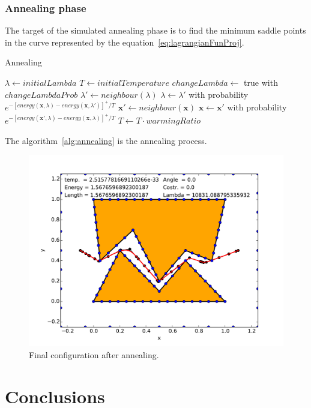 \documentclass[a4paper]{article}
\begin{document}
\subsubsection{Annealing phase}
The target of the simulated annealing phase is to find the minimum
saddle points in
the curve represented by the
equation~\eqref{eq:lagrangianFunProj}.
\begin{algorithm}
 \caption{Annealing}\label{alg:annealing}
 \begin{algorithmic}[1]
   \State $\lambda\gets initialLambda$
   \State $T\gets initialTemperature$
   \State $changeLambda\gets$ true with $changeLambdaProb$
   \State $\lambda'\gets neighbour(\lambda)$
   \State $\lambda\gets \lambda'$ with probability $e^{-[energy(\mathbf{x},\lambda)-energy(\mathbf{x},\lambda')]^+/T}$
   \Else
   \State $\mathbf{x}'\gets neighbour(\mathbf{x})$
   \State $\mathbf{x}\gets \mathbf{x}'$ with probability $e^{-[energy(\mathbf{x}',\lambda)-energy(\mathbf{x},\lambda)]^+/T}$
   \EndIf
   \EndFor
   \State $T\gets T\cdot warmingRatio$
   \EndWhile
   \EndProcedure
 \end{algorithmic}
\end{algorithm}
 The algorithm~\ref{alg:annealing} is the annealing process.

\begin{figure}[htb]
  \centering
  \includegraphics[width=\textwidth]{img/final.pdf}
  \caption{Final configuration after annealing.}
  \label{fig:final}
\end{figure}

\section{Conclusions}
\end{document}
